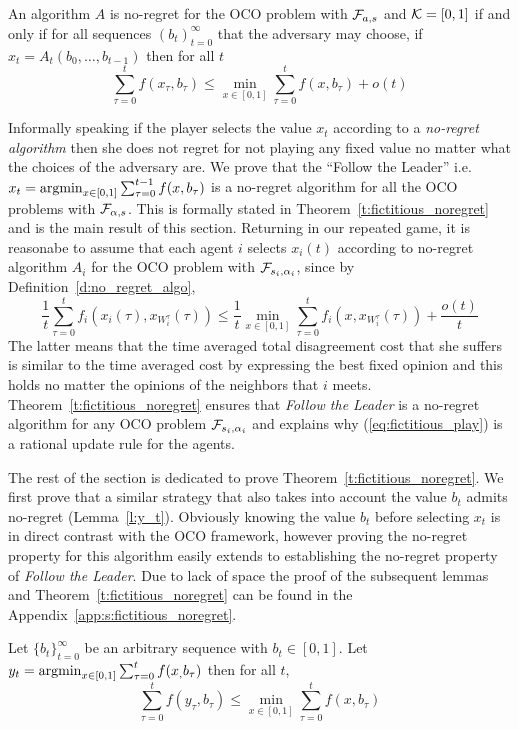 \begin{definition}\label{d:no_regret_algo}
An algorithm $A$ is no-regret for the OCO problem with $\mathcal{F}_{a,s}$ and
$\mathcal{K}=[0,1]$ if and only if for all sequences $(b_t)_{t=0}^\infty$ that the
adversary may choose, if $x_t = A_t(b_0,\dots,b_{t-1})$ then for all $t$
\[\sum_{\tau=0}^t f(x_\tau,b_\tau)  \leq \min_{x \in [0,1]}\sum_{\tau=0}^t f(x,b_\tau) + o(t) \]
\end{definition}
Informally speaking if the player selects the value
$x_t$ according to a \emph{no-regret algorithm} then
she does not regret for not playing any fixed value no
matter what the choices of the adversary are.
We prove that the \enquote{Follow the Leader} i.e.
$x_t = \operatorname*{argmin}_{x \in [0,1]}\sum_{\tau=0}^{t-1}f(x,b_\tau)$
is a no-regret algorithm for all the OCO problems with $\mathcal{F}_{\alpha,s}$.
This is formally stated in Theorem~\ref{t:fictitious_noregret}
and is the main result of this section.
Returning in our repeated game, it is reasonabe to
assume that each agent $i$ selects $x_i(t)$ according
to no-regret algorithm $A_i$ for the OCO problem with $\mathcal{F}_{s_i,\alpha_i}$,
since by Definition~\ref{d:no_regret_algo},
\[\frac{1}{t}\sum_{\tau=0}^t f_i(x_i(\tau),x_{W_i^\tau}(\tau)) \leq
\frac{1}{t}\min_{x \in [0,1]}\sum_{\tau=0}^tf_i(x,x_{W_i^\tau}(\tau)) + \frac{o(t)}{t}\]
The latter means that the time averaged total disagreement cost
that she suffers is similar to the time averaged cost by expressing the
best fixed opinion and this holds no matter the opinions of the
neighbors that $i$ meets. Theorem~\ref{t:fictitious_noregret}
ensures that \emph{Follow the Leader} is a no-regret algorithm
for any OCO problem $\mathcal{F}_{s_i,\alpha_i}$ and explains why
(\ref{eq:fictitious_play}) is a rational update rule for the agents.

The rest of the section is dedicated to prove Theorem~\ref{t:fictitious_noregret}.
We first prove that a similar strategy that also takes into
account the value $b_t$ admits no-regret (Lemma~\ref{l:y_t}).
Obviously knowing the value $b_t$ before selecting $x_t$
is in direct contrast with the OCO framework, however proving
the no-regret property for this algorithm easily extends to
establishing the no-regret property of \emph{Follow the Leader}.
Due to lack of space the proof of the subsequent lemmas and 
Theorem~\ref{t:fictitious_noregret} can be found in the
Appendix~\ref{app:s:fictitious_noregret}.

\begin{lemma}\label{l:y_t}
Let $\{b_t\}_{t=0}^\infty$ be an arbitrary sequence with $b_t \in [0,1]$. Let $y_t = \operatorname*{argmin}_{x \in [0,1]}\sum_{\tau=0}^tf(x_,b_\tau)$
then for all $t$,
\[
\sum_{\tau=0}^t f(y_\tau,b_\tau) \leq \min_{x \in [0,1]}\sum_{\tau = 0}^tf(x,b_\tau)
\]
\end{lemma}

